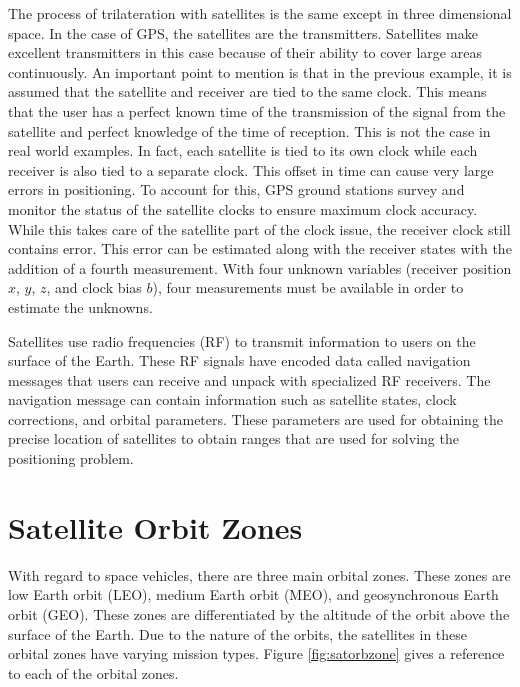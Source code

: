 \documentclass[12pt]{report}
\begin{document}
The process of trilateration with satellites is the same except in three dimensional space. In the case of GPS, the satellites are the transmitters. Satellites make excellent transmitters in this case because of their ability to cover large areas continuously. An important point to mention is that in the previous example, it is assumed that the satellite and receiver are tied to the same clock. This means that the user has a perfect known time of the transmission of the signal from the satellite and perfect knowledge of the time of reception. This is not the case in real world examples. In fact, each satellite is tied to its own clock while each receiver is also tied to a separate clock. This offset in time can cause very large errors in positioning. To account for this, GPS ground stations survey and monitor the status of the satellite clocks to ensure maximum clock accuracy. While this takes care of the satellite part of the clock issue, the receiver clock still contains error. This error can be estimated along with the receiver states with the addition of a fourth measurement. With four unknown variables (receiver position $x$, $y$, $z$, and clock bias $b$), four measurements must be available in order to estimate the unknowns. 

Satellites use radio frequencies (RF) to transmit information to users on the surface of the Earth. These RF signals have encoded data called navigation messages that users can receive and unpack with specialized RF receivers. The navigation message can contain information such as satellite states, clock corrections, and orbital parameters. These parameters are used for obtaining the precise location of satellites to obtain ranges that are used for solving the positioning problem. 

\section{Satellite Orbit Zones}

With regard to space vehicles, there are three main orbital zones. These zones are low Earth orbit (LEO), medium Earth orbit (MEO), and geosynchronous Earth orbit (GEO). These zones are differentiated by the altitude of the orbit above the surface of the Earth. Due to the nature of the orbits, the satellites in these orbital zones have varying mission types. Figure \ref{fig:satorbzone} gives a reference to each of the orbital zones. 
\end{document}
